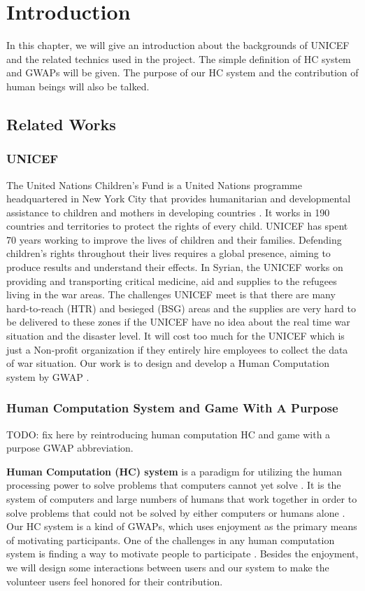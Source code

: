 \section{Introduction}

In this chapter, we will give an introduction about the backgrounds of UNICEF and the related technics 
used in the project. The simple definition of HC system and GWAPs will be given. 
The purpose of our HC system and the contribution of human beings will also be talked.

\subsection{Related Works}

\subsubsection{UNICEF}
The United Nations Children's Fund \cite{unicef1994state} is a United Nations programme headquartered
in New York City that provides humanitarian and developmental assistance to 
children and mothers in developing countries \cite{wiki:UNICEF}.
It works in 190 countries and territories to protect the rights of every child. 
UNICEF has spent 70 years working to improve the lives of children and their families. 
Defending children's rights throughout their lives requires a global presence, 
aiming to produce results and understand their effects. 
In Syrian, the UNICEF works on providing and transporting critical medicine, 
aid and supplies to the refugees living in the war areas. The challenges UNICEF meet is that 
there are many hard-to-reach (HTR) and besieged (BSG) areas and the supplies are 
very hard to be delivered to these zones if the UNICEF have no idea about 
the real time war situation and the disaster level. It will cost too much for the UNICEF 
which is just a Non-profit organization if they entirely hire employees to 
collect the data of war situation. 
Our work is to design and develop a Human Computation system by GWAP \cite{lafourcade2015games}.

\subsubsection{Human Computation System and Game With A Purpose}
TODO: fix here by reintroducing human computation HC and game with a purpose GWAP abbreviation.

\textbf{Human Computation (HC) system} is a paradigm for utilizing the human processing power to solve problems that 
computers cannot yet solve \cite{quinn2011human}. 
It is the system of computers and large numbers of humans that work together in order to solve problems that 
could not be solved by either computers or humans alone \cite{quinn2009taxonomy}.
Our HC system is a kind of GWAPs, which uses enjoyment as the primary means of motivating participants. 
One of the challenges in any human computation system is finding a way to motivate people 
to participate \cite{quinn2011human}. 
Besides the enjoyment, we will design some interactions between users and our system to 
make the volunteer users feel honored for their contribution.

